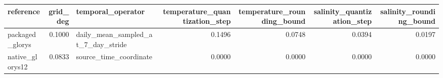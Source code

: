 \begin{tabular}{lrlrrrr}
\toprule
reference & grid_deg & temporal_operator & temperature_quantization_step & temperature_rounding_bound & salinity_quantization_step & salinity_rounding_bound \\
\midrule
packaged_glorys & 0.1000 & daily_mean_sampled_at_7_day_stride & 0.1496 & 0.0748 & 0.0394 & 0.0197 \\
native_glorys12 & 0.0833 & source_time_coordinate & 0.0000 & 0.0000 & 0.0000 & 0.0000 \\
\bottomrule
\end{tabular}
